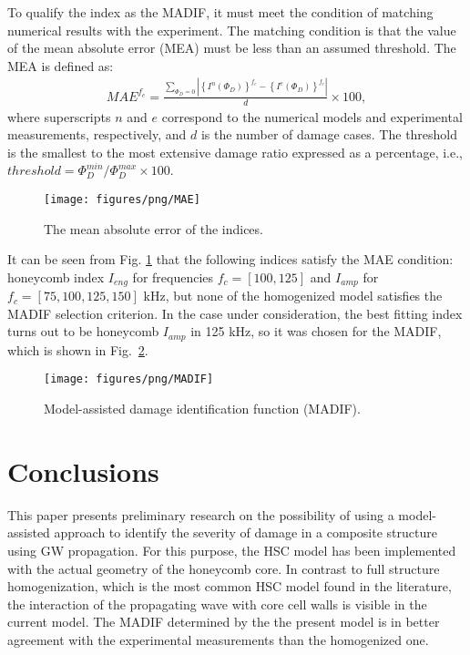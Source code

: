 \documentclass[sensors,article,submit,moreauthors,pdftex]{Definitions/mdpi}
\begin{document}
To qualify the index as the MADIF, it must meet the condition of matching numerical results with the experiment.
The matching condition is that the value of the mean absolute error (MEA) must be less than an assumed threshold.
The MEA is defined as:
\begin{eqnarray}
	MAE^{f_c} = \frac{\sum_{\Phi_D=0}{\left |\left\{I^{n}(\Phi_D)\right\}^{f_c}-\left\{I^{e}(\Phi_D)\right\}^{f_c}\right |}}{d}\times100,
\end{eqnarray}
where superscripts \(n\) and \(e\) correspond to the numerical models and experimental measurements, respectively, and \(d\) is the number of damage cases. The threshold is the smallest to the most extensive damage ratio expressed as a percentage, i.e., \(threshold=\Phi_D^{min}/\Phi_D^{max}\times100\).
\begin{figure}
	\begin{center}
		\texttt{[image: figures/png/MAE]}
	\end{center}
	\caption{The mean absolute error of the indices.}
	\label{fig:MAE}
\end{figure}
It can be seen from Fig. \ref{fig:MAE} that the following indices satisfy the MAE condition: honeycomb index \(I_{eng}\) for frequencies \(f_c=[100,125]\) and \(I_{amp}\) for \(f_c=[75,100, 125, 150]\) kHz, but none of the homogenized model satisfies the MADIF selection criterion.
In the case under consideration, the best fitting index turns out to be honeycomb \(I_{amp}\) in 125 kHz, so it was chosen for the MADIF, which is shown in Fig.~\ref{fig:MADIF}. 
\begin{figure}
	\begin{center}
		\texttt{[image: figures/png/MADIF]}
	\end{center}
	\caption{Model-assisted damage identification function (MADIF).}
	\label{fig:MADIF}
\end{figure}

\clearpage
\section{Conclusions}
\label{sec:conc}
This paper presents preliminary research on the possibility of using a model-assisted approach to identify the severity of damage in a composite structure using GW propagation.
For this purpose, the HSC model has been implemented with the actual geometry of the honeycomb core.
In contrast to  full structure homogenization, which is the most common HSC model found in the literature, the interaction of the propagating wave with core cell walls is visible in the current model.
The MADIF determined by the the present model is in better agreement with the experimental measurements than the homogenized one.
\end{document}
